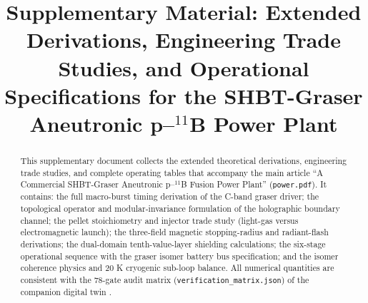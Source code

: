 \documentclass[10pt,journal,compsoc]{IEEEtran}
\title{Supplementary Material: Extended Derivations, Engineering Trade
Studies, and Operational Specifications for the SHBT-Graser Aneutronic
p--$^{11}$B Power Plant}
\author{}
\begin{document}
\maketitle

\begin{abstract}
This supplementary document collects the extended theoretical derivations,
engineering trade studies, and complete operating tables that accompany the
main article ``A Commercial SHBT-Graser Aneutronic p--$^{11}$B Fusion Power
Plant'' (\texttt{power.pdf}). It contains: the full macro-burst timing
derivation of the C-band graser driver; the topological operator and
modular-invariance formulation of the holographic boundary channel; the
pellet stoichiometry and injector trade study (light-gas versus
electromagnetic launch); the three-field magnetic stopping-radius and
radiant-flash derivations; the dual-domain tenth-value-layer shielding
calculations; the six-stage operational sequence with the graser isomer
battery bus specification; and the isomer coherence physics and 20 K
cryogenic sub-loop balance. All numerical quantities are consistent with
the 78-gate audit matrix (\texttt{verification\_matrix.json}) of the
companion digital twin \cite{mainpaper,sys1own_twin2026}.
\end{abstract}
\end{document}

